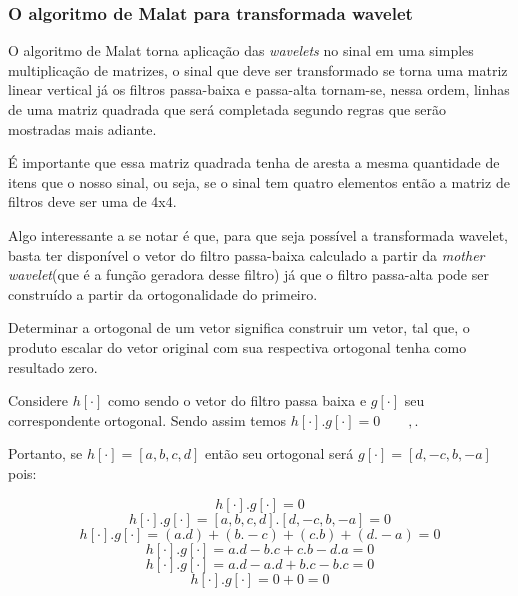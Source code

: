 \begin{myenv}{1.5}
			\subsubsection{O algoritmo de Malat para transformada wavelet}
				\par O algoritmo de Malat torna aplicação das \textit{wavelets} no sinal em uma simples multiplicação de matrizes, o sinal que deve ser transformado se torna uma matriz linear vertical já os filtros passa-baixa e passa-alta tornam-se, nessa ordem, linhas de uma matriz quadrada que será completada segundo regras que serão mostradas mais adiante.
				\par É importante que essa matriz quadrada tenha de aresta a mesma quantidade de itens que o nosso sinal, ou seja, se o sinal tem quatro elementos então a matriz de filtros deve ser uma de 4x4.
				\par Algo interessante a se notar é que, para que seja possível a transformada wavelet, basta ter disponível o vetor do filtro passa-baixa calculado a partir da \textit{mother wavelet}(que é a função geradora desse filtro) já que o filtro passa-alta pode ser construído a partir da ortogonalidade do primeiro.
				
				\par Determinar a ortogonal de um vetor significa construir um vetor, tal que, o produto escalar do vetor original com sua respectiva ortogonal tenha como resultado zero.
				
				\par Considere $h[\cdot]$ como sendo o vetor do filtro passa baixa e $g[\cdot]$ seu correspondente ortogonal. Sendo assim temos $h[\cdot] . g[\cdot] = 0\qquad,$.
				
				\par Portanto, se $h[\cdot]=[a, b, c, d]$ então seu ortogonal será $g[\cdot]=[d, -c, b, -a]$ pois:
				
				\begin{equation}
					h[\cdot] . g[\cdot]  = 0
				\end{equation}
				\begin{equation}
					h[\cdot] . g[\cdot]  = [a, b, c, d] . [d, -c, b, -a] = 0
				\end{equation}
				\begin{equation}
					h[\cdot] . g[\cdot]  = (a.d) + (b.-c) + (c.b) + (d.-a) = 0
				\end{equation}
				\begin{equation}
					h[\cdot] . g[\cdot]  = a.d - b.c + c.b - d.a = 0
				\end{equation}
				\begin{equation}
					h[\cdot] . g[\cdot]  = a.d - a.d + b.c - b.c = 0
				\end{equation}
				\begin{equation}
					h[\cdot] . g[\cdot]  = 0 + 0 = 0
				\end{equation}


\end{myenv}
